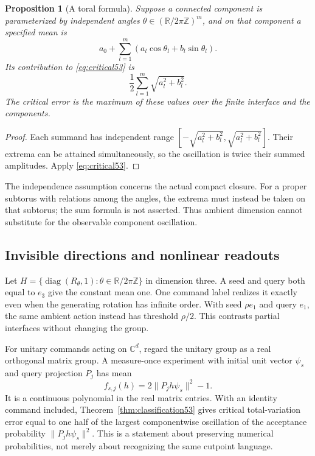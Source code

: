 \documentclass[11pt]{amsart}
\numberwithin{equation}{section}
\newtheorem{proposition}[theorem]{Proposition}
\theoremstyle{definition}
\theoremstyle{remark}
\newcommand{\R}{\mathbb R}
\newcommand{\C}{\mathbb C}
\newcommand{\norm}[1]{\lVert #1\rVert}
\DeclareMathOperator{\diag}{diag}
\begin{document}
\begin{proposition}[A toral formula]\label{prop:torus53}
Suppose a connected component is parameterized by independent angles $\theta\in(\R/2\pi\mathbb Z)^m$, and on that component a specified mean is
\[
 a_0+\sum_{l=1}^m(a_l\cos\theta_l+b_l\sin\theta_l).
\]
Its contribution to \eqref{eq:critical53} is
\[
                 \frac12\sum_{l=1}^m\sqrt{a_l^2+b_l^2}.
\]
The critical error is the maximum of these values over the finite interface and the components.
\end{proposition}
\begin{proof}
Each summand has independent range $[-\sqrt{a_l^2+b_l^2},\sqrt{a_l^2+b_l^2}]$. Their extrema can be attained simultaneously, so the oscillation is twice their summed amplitudes. Apply \eqref{eq:critical53}.
\end{proof}
The independence assumption concerns the actual compact closure. For a proper subtorus with relations among the angles, the extrema must instead be taken on that subtorus; the sum formula is not asserted. Thus ambient dimension cannot substitute for the observable component oscillation.

\subsection{Invisible directions and nonlinear readouts}
Let $H=\{\diag(R_\theta,1):\theta\in\R/2\pi\mathbb Z\}$ in dimension three. A seed and query both equal to $e_3$ give the constant mean one. One command label realizes it exactly even when the generating rotation has infinite order. With seed $\rho e_1$ and query $e_1$, the same ambient action instead has threshold $\rho/2$. This contrasts partial interfaces without changing the group.

For unitary commands acting on $\C^d$, regard the unitary group as a real orthogonal matrix group. A measure-once experiment with initial unit vector $\psi_s$ and query projection $P_j$ has mean
\[
 f_{s,j}(h)=2\norm{P_jh\psi_s}^2-1.
\]
It is a continuous polynomial in the real matrix entries. With an identity command included, Theorem~\ref{thm:classification53} gives critical total-variation error equal to one half of the largest componentwise oscillation of the acceptance probability $\norm{P_jh\psi_s}^2$. This is a statement about preserving numerical probabilities, not merely about recognizing the same cutpoint language.
\end{document}
